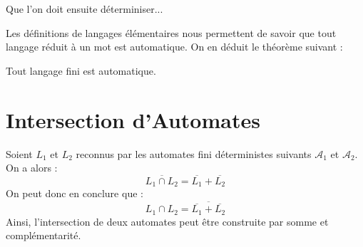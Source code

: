 \begin{example}
\begin{center}
\begin{minipage}{0.45\textwidth}
        \end{minipage}%
        \hfill 
        \begin{minipage}{0.45\textwidth}
        \end{minipage}
    \end{center}

    Que l'on doit ensuite déterminiser... 
\end{example}

Les définitions de langages élémentaires nous permettent de savoir que tout langage réduit à un mot est automatique. 
On en déduit le théorème suivant : 

\begin{theorem}
    Tout langage fini est automatique. 
\end{theorem}



\section{Intersection d'Automates}

\begin{proposition}
    Soient $L_1$ et $L_2$ reconnus par les automates fini déterministes suivants $ \mathcal{A}_1$ et $ \mathcal{A}_2$. 
    On a alors : 
        \[ \overline{L_1 \cap L_2} = \overline{L_1} + \overline{L_2} \]
    On peut donc en conclure que : 
        \[ \boxed{L_1 \cap L_2 = \overline{\overline{L_1} + \overline{L_2}}} \]  
    Ainsi, l'intersection de deux automates peut être construite par somme et complémentarité. 
\end{proposition}

